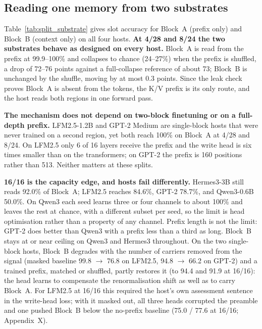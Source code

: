\subsection{Reading one memory from two substrates}
\label{sec:results_split}

Table~\ref{tab:split_substrate} gives slot accuracy for Block~A (prefix only) and Block~B (context only)
on all four hosts. \textbf{At 4/28 and 8/24 the two substrates behave as designed on every host.} Block~A is
read from the prefix at 99.9--100\% and collapses to chance (24--27\%) when the prefix is shuffled, a drop of
72--76 points against a full-collapse reference of about 73; Block~B is unchanged by the shuffle, moving by
at most 0.3 points. Since the leak check proves Block~A is absent from the tokens, the K/V prefix is its
only route, and the host reads both regions in one forward pass.

\textbf{The mechanism does not depend on two-block finetuning or on a full-depth prefix.} LFM2.5-1.2B
and GPT-2 Medium are single-block hosts that were never trained on a second region, yet both reach 100\%
on Block~A at 4/28 and 8/24. On LFM2.5 only 6 of 16 layers receive the prefix and the write head is six
times smaller than on the transformers; on GPT-2 the prefix is 160 positions rather than 513. Neither
matters at these splits.

\textbf{16/16 is the capacity edge, and hosts fail differently.} Hermes3-3B still reads 92.0\% of Block~A;
LFM2.5 reaches 84.6\%, GPT-2 78.7\%, and Qwen3-0.6B 50.0\%. On Qwen3 each seed learns three or four
channels to about 100\% and leaves the rest at chance, with a different subset per seed, so the limit is
head optimisation rather than a property of any channel. Prefix length is not the limit: GPT-2 does better
than Qwen3 with a prefix less than a third as long. Block~B stays at or near ceiling on Qwen3 and Hermes3
throughout. On the two single-block hosts, Block~B degrades with the number of carriers removed from the
signal (masked baseline 99.8 $\to$ 76.8 on LFM2.5, 94.8 $\to$ 66.2 on GPT-2) and a trained prefix,
matched or shuffled, partly restores it (to 94.4 and 91.9 at 16/16): the head learns to compensate the
renormalisation shift as well as to carry Block~A. For LFM2.5 at 16/16 this required the host's own
assessment sentence in the write-head loss; with it masked out, all three heads corrupted the preamble and
one pushed Block~B below the no-prefix baseline (75.0 / 77.6 at 16/16; Appendix~X).

